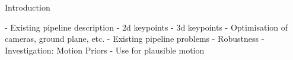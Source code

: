 Introduction

- Existing pipeline description
    - 2d keypoints
    - 3d keypoints
    - Optimisation of cameras, ground plane, etc.
- Existing pipeline problems
    - Robustness
- Investigation: Motion Priors
    - Use for plausible motion
    